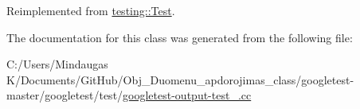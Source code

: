Reimplemented from \mbox{\hyperlink{classtesting_1_1_test_a5f0ab439802cbe0ef7552f1a9f791923}{testing\+::\+Test}}.



The documentation for this class was generated from the following file\+:\begin{DoxyCompactItemize}
\item 
C\+:/\+Users/\+Mindaugas K/\+Documents/\+Git\+Hub/\+Obj\+\_\+\+Duomenu\+\_\+apdorojimas\+\_\+class/googletest-\/master/googletest/test/\mbox{\hyperlink{googletest-master_2googletest_2test_2googletest-output-test___8cc}{googletest-\/output-\/test\+\_\+.\+cc}}\end{DoxyCompactItemize}
